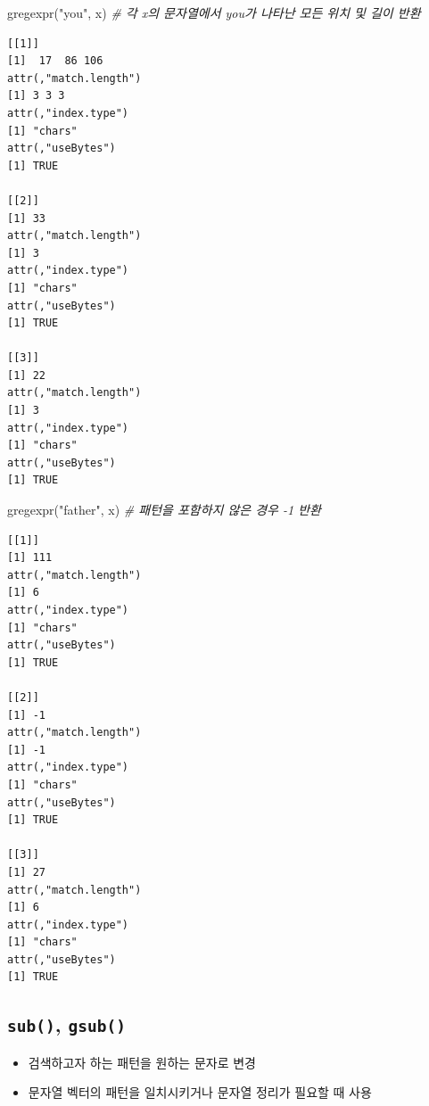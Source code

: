 \documentclass[
  11pt,
]{krantz}
\newenvironment{Shaded}{\begin{snugshade}}{\end{snugshade}}
\newcommand{\CommentTok}[1]{\textcolor[rgb]{0.37,0.37,0.37}{\textit{#1}}}
\newcommand{\FunctionTok}[1]{\textcolor[rgb]{0,0,0}{#1}}
\newcommand{\NormalTok}[1]{#1}
\newcommand{\StringTok}[1]{\textcolor[rgb]{0.5,0.5,0.5}{#1}}
\begin{document}
\footnotesize

\begin{Shaded}
\begin{Highlighting}[]
\FunctionTok{gregexpr}\NormalTok{(}\StringTok{"you"}\NormalTok{, x) }\CommentTok{\# 각 x의 문자열에서 you가 나타난 모든 위치 및 길이 반환}
\end{Highlighting}
\end{Shaded}

\begin{verbatim}
[[1]]
[1]  17  86 106
attr(,"match.length")
[1] 3 3 3
attr(,"index.type")
[1] "chars"
attr(,"useBytes")
[1] TRUE

[[2]]
[1] 33
attr(,"match.length")
[1] 3
attr(,"index.type")
[1] "chars"
attr(,"useBytes")
[1] TRUE

[[3]]
[1] 22
attr(,"match.length")
[1] 3
attr(,"index.type")
[1] "chars"
attr(,"useBytes")
[1] TRUE
\end{verbatim}

\begin{Shaded}
\begin{Highlighting}[]
\FunctionTok{gregexpr}\NormalTok{(}\StringTok{"father"}\NormalTok{, x) }\CommentTok{\# 패턴을 포함하지 않은 경우 {-}1 반환}
\end{Highlighting}
\end{Shaded}

\begin{verbatim}
[[1]]
[1] 111
attr(,"match.length")
[1] 6
attr(,"index.type")
[1] "chars"
attr(,"useBytes")
[1] TRUE

[[2]]
[1] -1
attr(,"match.length")
[1] -1
attr(,"index.type")
[1] "chars"
attr(,"useBytes")
[1] TRUE

[[3]]
[1] 27
attr(,"match.length")
[1] 6
attr(,"index.type")
[1] "chars"
attr(,"useBytes")
[1] TRUE
\end{verbatim}

\normalsize

\hypertarget{sub-gsub-fun}{%
\subsection{\texorpdfstring{\textbf{\texttt{sub()}}, \textbf{\texttt{gsub()}}}{sub(), gsub()}}\label{sub-gsub-fun}}

\begin{itemize}
\item
  검색하고자 하는 패턴을 원하는 문자로 변경
\item
  문자열 벡터의 패턴을 일치시키거나 문자열 정리가 필요할 때 사용
\end{itemize}
\end{document}
